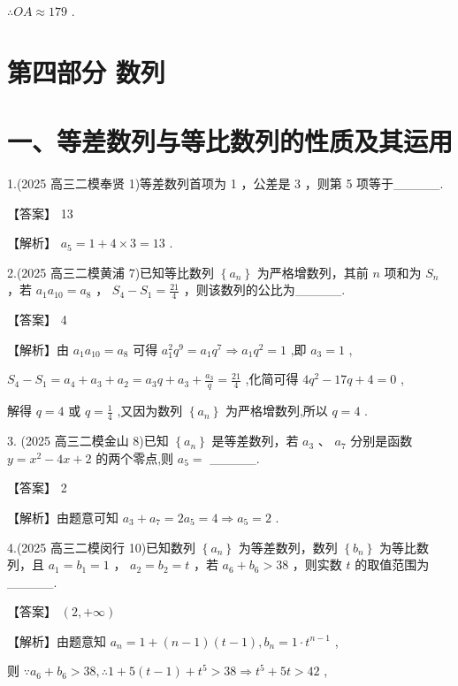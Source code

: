 \documentclass[10pt]{article}
\begin{document}
\(\therefore {OA} \approx  {179}\) .

\section*{第四部分 数列}

\section*{一、等差数列与等比数列的性质及其运用}

1.(2025 高三二模奉贤 1)等差数列首项为 1 ，公差是 3 ，则第 5 项等于\_\_\_\_\_.

【答案】 13

【解析】 \({a}_{5} = 1 + 4 \times  3 = {13}\) .

2.(2025 高三二模黄浦 7)已知等比数列 \(\left\{  {a}_{n}\right\}\) 为严格增数列，其前 \(n\) 项和为 \({S}_{n}\) ，若 \({a}_{1}{a}_{10} = {a}_{8}\) ， \({S}_{4} - {S}_{1} = \frac{21}{4}\) ，则该数列的公比为\_\_\_\_\_.

【答案】 4

【解析】由 \({a}_{1}{a}_{10} = {a}_{8}\) 可得 \({a}_{1}^{2}{q}^{9} = {a}_{1}{q}^{7} \Rightarrow  {a}_{1}{q}^{2} = 1\) ,即 \({a}_{3} = 1\) ,

\({S}_{4} - {S}_{1} = {a}_{4} + {a}_{3} + {a}_{2} = {a}_{3}q + {a}_{3} + \frac{{a}_{3}}{q} = \frac{21}{4}\) ,化简可得 \(4{q}^{2} - {17q} + 4 = 0\) ,

解得 \(q = 4\) 或 \(q = \frac{1}{4}\) ,又因为数列 \(\left\{  {a}_{n}\right\}\) 为严格增数列,所以 \(q = 4\) .

3. (2025 高三二模金山 8)已知 \(\left\{  {a}_{n}\right\}\) 是等差数列，若 \({a}_{3}\text{ 、 }{a}_{7}\) 分别是函数 \(y = {x}^{2} - {4x} + 2\) 的两个零点,则 \({a}_{5} =\) \_\_\_\_\_.

【答案】 2

【解析】由题意可知 \({a}_{3} + {a}_{7} = 2{a}_{5} = 4 \Rightarrow  {a}_{5} = 2\) .

4.(2025 高三二模闵行 10)已知数列 \(\left\{  {a}_{n}\right\}\) 为等差数列，数列 \(\left\{  {b}_{n}\right\}\) 为等比数列，且 \({a}_{1} = {b}_{1} = 1\) ， \({a}_{2} = {b}_{2} = t\) ，若 \({a}_{6} + {b}_{6} > {38}\) ，则实数 \(t\) 的取值范围为\_\_\_\_\_.

【答案】 \(\left( {2, + \infty }\right)\)

【解析】由题意知 \({a}_{n} = 1 + \left( {n - 1}\right) \left( {t - 1}\right) ,{b}_{n} = 1 \cdot  {t}^{n - 1}\) ,

则 \(\because {a}_{6} + {b}_{6} > {38},\therefore 1 + 5\left( {t - 1}\right)  + {t}^{5} > {38} \Rightarrow  {t}^{5} + {5t} > {42}\) ,
\end{document}
